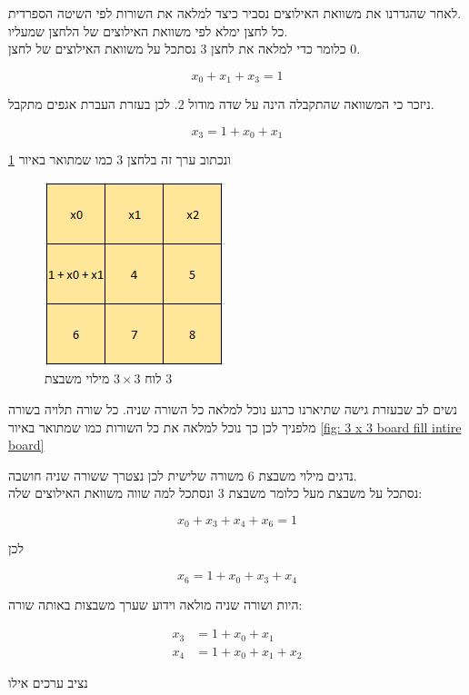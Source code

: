 \documentclass[12pt,twoside]{article}
\begin{document}
לאחר שהגדרנו את משוואת האילוצים נסביר כיצד למלאה 
את השורות לפי השיטה הספרדית.
\\
כל לחצן ימלא לפי משוואת האילוצים של הלחצן שמעליו.
\\
כלומר 
כדי למלאה את לחצן 
$3$
נסתכל על משוואת האילוצים של לחצן 
$0$.

\[ x_0 + x_1 + x_3 = 1\]

ניזכר כי המשוואה שהתקבלה הינה על שדה מודול
$2$.
לכן בעזרת העברת אגפים מתקבל.

\[ x_3 = 1 + x_0 + x_1 \]

ונכתוב ערך זה בלחצן 
$3$
כמו שמתואר באיור 
\ref{fig: 3 x 3 board fill button 3}

\begin{figure}[ht]
    \caption{לוח 
    $3 \times 3$
    מילוי משבצת
    $3$}
    \label{fig: 3 x 3 board fill button 3}
    \unsethebrew
    \centering
    \includegraphics[width=.3\textwidth,height=.3\textheight,keepaspectratio]{images/3x3_fill_button_3.PNG}
\end{figure}
\sethebrew

נשים לב שבעזרת גישה שתיארנו כרגע נוכל למלאה כל השורה שניה.
כל שורה תלויה בשורה מלפניך לכן כך נוכל למלאה את כל השורות 
כמו שמתואר באיור 
\ref{fig: 3 x 3 board fill intire board}

נדגים מילוי משבצת
$6$
משורה שלישית לכן נצטרך ששורה
שניה חושבה.
\\
נסתכל על משבצת מעל 
כלומר משבצת 
$3$
ונסתכל למה שווה משוואת האילוצים שלה:

\[ x_0 + x_3 + x_4 + x_6 = 1 \]

לכן 

\[ x_6 = 1 + x_0 + x_3 + x_4  \]

היות ושורה שניה מולאה וידוע שערך משבצות 
באותה שורה: 

\begin{align*}
    x_3 &= 1 + x_0 + x_1 \\
    x_4 &= 1 + x_0 + x_1 + x_2
\end{align*}
    


נציב ערכים אילו
\end{document}
